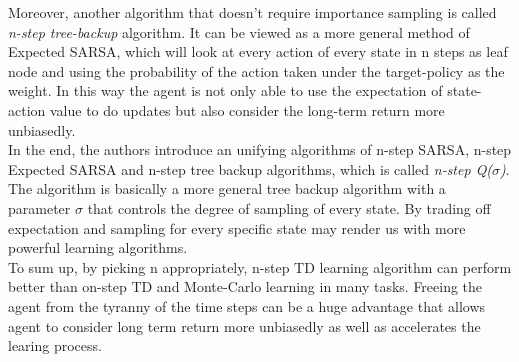 \documentclass[12pt,a4paper]{article}
\begin{document}
Moreover, another algorithm that doesn't require importance sampling is called \textit{n-step tree-backup} algorithm. It can be viewed as a more general method of Expected SARSA, which will look at every action of  
every state in n steps as leaf node and using the probability of the action taken under the target-policy as the weight. In this way the agent is not only able to use the expectation of state-action value to do updates but also consider the long-term return more unbiasedly.\\

In the end, the authors introduce an unifying algorithms of n-step SARSA, n-step Expected SARSA and n-step tree backup algorithms, which is called \textit{n-step Q($\sigma$)}. The algorithm is basically a more general tree backup algorithm with a parameter $\sigma$ that controls the degree of sampling of every state. By trading off expectation and sampling for every specific state may render us with more powerful learning algorithms.\\

To sum up, by picking n appropriately, n-step TD learning algorithm can perform better than on-step TD and Monte-Carlo learning in many tasks. Freeing the agent from the tyranny of the time steps can be a huge advantage that allows agent to consider long term return more unbiasedly as well as accelerates the learing process.
\end{document}
